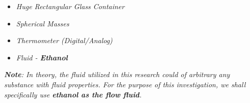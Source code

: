 \begin{itemize}
    \item \textit{Huge Rectangular Glass Container}
    \item \textit{Spherical Masses}
    \item \textit{Thermometer (Digital/Analog)}
    \item \textit{Fluid - \textbf{Ethanol}}
    \label{mat}
\end{itemize}

\textit{\textbf{Note}: In theory, the fluid utilized in this research could of arbitrary any substance with fluid properties. For the purpose of this investigation, we shall specifically use \textbf{ethanol as the flow fluid}.}


